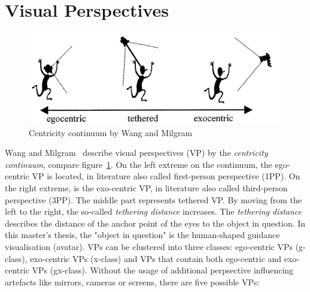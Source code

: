 \section{Visual Perspectives}
\label{section:visual_perspectives}
\begin{figure}[H]
	\centering
	\includegraphics[width=\textwidth]{figures/ego_exo_continuum.PNG}
	\caption[Centricity continuum by Wang et al.]{Centricity continuum by Wang and Milgram~\cite{centricitycontinuum}}
	\label{fig:ego-exo-continuum}
\end{figure}
Wang and Milgram~\cite{centricitycontinuum} describe visual perspectives (VP) by the \textit{centricity continuum}, compare figure~\ref{fig:ego-exo-continuum}. On the left extreme on the continuum, the ego-centric VP is located, in literature also called first-person perspective (1PP). On the right extreme, is the exo-centric VP, in literature also called third-person perspective (3PP). The middle part represents tethered VP. By moving from the left to the right, the so-called \textit{tethering distance} increases. The \textit{tethering distance} describes the distance of the anchor point of the eyes to the object in question. In this master's thesis, the "object in question" is the human-shaped guidance visualisation (avatar). VPs can be clustered into three classes: ego-centric VPs (g-class), exo-centric VPs (x-class) and VPs that contain both ego-centric and exo-centric VPs (gx-class). Without the usage of additional perpsective influencing artefacts like mirrors, cameras or screens, there are five possible VPs:
